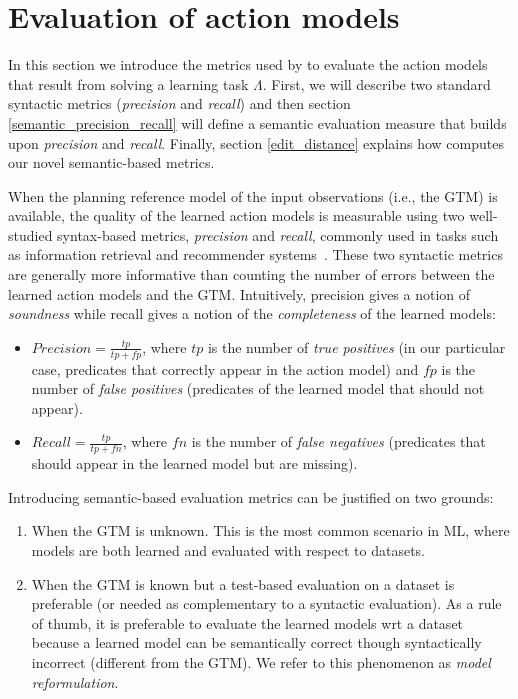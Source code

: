 
\section{Evaluation of action models}
\label{sec:evaluation}

In this section we introduce the metrics used by \FAMA to evaluate the action models that result from solving a learning task $\Lambda$. First, we will describe two standard syntactic metrics ({\em precision} and {\em recall}) and then section \ref{semantic_precision_recall} will define a semantic evaluation measure that builds upon {\em precision} and {\em recall}. Finally, section \ref{edit_distance} explains how \FAMA computes our novel semantic-based metrics.

\vspace{0.1cm}

When the planning reference model of the input observations (i.e., the GTM) is available, the quality of the learned action models is measurable using two well-studied syntax-based metrics, {\em precision} and {\em recall}, commonly used in tasks such as information retrieval and recommender systems~\cite{davis2006relationship}. These two syntactic metrics are generally more informative than counting the number of errors between the learned action models and the GTM. Intuitively, precision gives a notion of {\em soundness} while recall gives a notion of the {\em completeness} of the learned models:

\begin{itemize}
\item $Precision=\frac{tp}{tp+fp}$, where $tp$ is the number of {\em true positives} (in our particular case, predicates that correctly appear in the action model) and $fp$ is the number of {\em false positives} (predicates of the learned model that should not appear).
\item $Recall=\frac{tp}{tp+fn}$, where $fn$ is the number of {\em false negatives} (predicates that should appear in the learned model but are missing).
\end{itemize}


Introducing semantic-based evaluation metrics can be justified on two grounds:

\begin{enumerate}
\item When the GTM is unknown. This is the most common scenario in ML, where models are both learned and evaluated with respect to datasets.
\item When the GTM is known but a test-based evaluation on a dataset is preferable (or needed as complementary to a syntactic evaluation). As a rule of thumb, it is preferable to evaluate the learned models wrt a dataset because a learned model can be semantically correct though syntactically incorrect (different from the GTM). We refer to this phenomenon as \emph{model reformulation}.
\end{enumerate}

